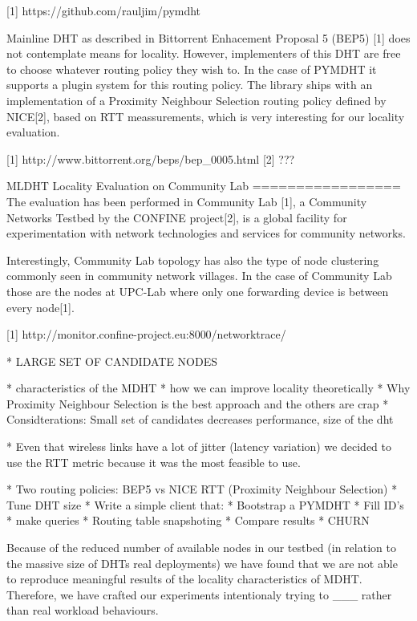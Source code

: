     [1] https://github.com/rauljim/pymdht

Mainline DHT as described in Bittorrent Enhacement Proposal 5 (BEP5) [1] does not contemplate means for locality. However, implementers of this DHT are free to choose whatever routing policy they wish to. In the case of PYMDHT it supports a plugin system for this routing policy. The library ships with an implementation of a Proximity Neighbour Selection routing policy defined by NICE[2], based on RTT meassurements, which is very interesting for our locality evaluation.

    [1] http://www.bittorrent.org/beps/bep_0005.html
    [2] ???



MLDHT Locality Evaluation on Community Lab
=================
The evaluation has been performed in Community Lab [1], a Community Networks Testbed by the CONFINE project[2], is a global facility for experimentation with network technologies and services for community networks.

Interestingly, Community Lab topology has also the type of node clustering commonly seen in community network villages. In the case of Community Lab those are the nodes at UPC-Lab where only one forwarding device is between every node[1].

[1] http://monitor.confine-project.eu:8000/networktrace/





* LARGE SET OF CANDIDATE NODES


* characteristics of the MDHT
* how we can improve locality theoretically
* Why Proximity Neighbour Selection is the best approach and the others are crap
* Considterations: Small set of candidates decreases performance, size of the dht

* Even that wireless links have a lot of jitter (latency variation) we decided to use the RTT metric because it was the most feasible to use.

* Two routing policies: BEP5 vs NICE RTT (Proximity Neighbour Selection)
* Tune DHT size
* Write a simple client that:
    * Bootstrap a PYMDHT
    * Fill ID's 
    * make queries
* Routing table snapshoting
* Compare results
* CHURN


Because of the reduced number of available nodes in our testbed (in relation to the massive size of DHTs real deployments) we have found that we are not able to reproduce meaningful results of the locality characteristics of MDHT. Therefore, we have crafted our experiments intentionaly trying to ___ rather than real workload behaviours.

